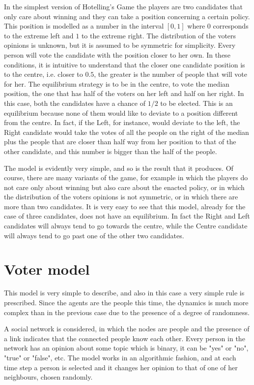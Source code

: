 \documentclass[11pt,a4paper,twocolumn]{article}
\begin{document}
In the simplest version of Hotelling's Game the players are two candidates that only care about winning and they can take a position concerning a certain policy. This position is modelled as a number in the interval $[0,1]$ where $0$ corresponds to the extreme left and $1$ to the extreme right. The distribution of the voters opinions is unknown, but it is assumed to be symmetric for simplicity. Every person will vote the candidate with the position closer to her own. In these conditions, it is intuitive to understand that the closer one candidate position is to the centre, i.e. closer to $0.5$, the greater is the number of people that will vote for her. 
The equilibrium strategy is to be in the centre, to vote the median position, the one that has half of the voters on her left and half on her right. 
In this case, both the candidates have a chance of $1/2$ to be elected. This is an equilibrium because none of them would like to deviate to a position different from the centre. In fact, if the Left, for instance, would deviate to the left, the Right candidate would take the votes of all the people on the right of the median plus the people that are closer than half way from her position to that of the other candidate, and this number is bigger than the half of the people.

The model is evidently very simple, and so is the result that it produces. Of course, there are many variants of the game, for example in which the players do not care only about winning but also care about the enacted policy, or in which the distribution of the voters opinions is not symmetric, or in which there are more than two candidates. It is very easy to see that this model, already for the case of three candidates, does not have an equilibrium. In fact the Right and Left candidates will always tend to go towards the centre, while the Centre candidate will always tend to go past one of the other two candidates.

\section*{Voter model}
\vspace*{-0.2cm}
This model is very simple to describe, and also in this case a very simple rule is prescribed. Since the agents are the people this time, the dynamics is much more complex than in the previous case due to the presence of a degree of randomness. 

A social network is considered, in which the nodes are people and the presence of a link indicates that the connected people know each other. Every person in the network has an opinion about some topic which is binary, it can be "yes" or "no", "true" or "false", etc. The model works in an algorithmic fashion, and at each time step a person is selected and it changes her opinion to that of one of her neighbours, chosen randomly.
\end{document}
